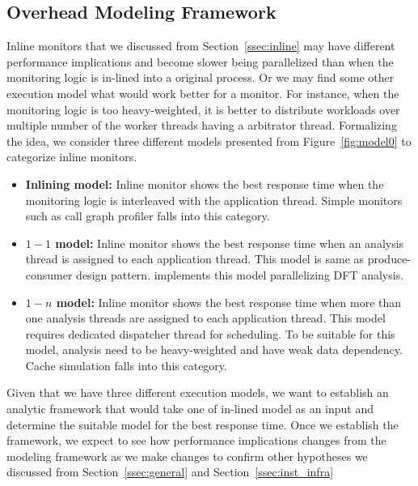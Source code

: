 \subsection{Overhead Modeling Framework}

Inline monitors that we discussed from Section~\ref{ssec:inline} may have
different performance implications and become slower being parallelized than
when the monitoring logic is in-lined into a original process. Or we may find
some other execution model what would work better for a monitor. For instance,
when the monitoring logic is too heavy-weighted, it is better to distribute
workloads over multiple number of the worker threads having a arbitrator
thread. Formalizing the idea, we consider three different models presented from
Figure~\ref{fig:model0} to categorize inline monitors.

\begin{itemize}

    \item{{\bf Inlining model:} Inline monitor shows the best response time
            when the monitoring logic is interleaved with the application
    thread. Simple monitors such as call graph profiler falls into this
    category.}

    \item{{\bf $1-1$ model:} Inline monitor shows the best response time when
            an analysis thread is assigned to each application thread. This
    model is same as produce-consumer design pattern. \sreplica implements this
    model parallelizing DFT analysis.}

    \item{{\bf $1-n$ model:} Inline monitor shows the best response time when
            more than one analysis threads are assigned to each application
    thread. This model requires dedicated dispatcher thread for scheduling. To
    be suitable for this model, analysis need to be heavy-weighted and have
    weak data dependency. Cache simulation falls into this category.}

\end{itemize}

%
Given that we have three different execution models, we want to establish an
analytic framework that would take one of in-lined model as an input and
determine the suitable model for the best response time. Once we establish the
framework, we expect to see how performance implications changes from the
modeling framework as we make changes to confirm other hypotheses we discussed
from Section~\ref{ssec:general} and Section~\ref{ssec:inst_infra} 

